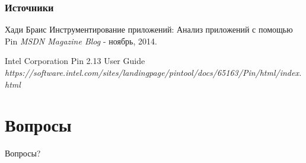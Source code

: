 \documentclass{beamer}
\begin{document}
\begin{frame}
\frametitle{Источники}
\footnotesize{
\begin{thebibliography}{99} %
 Хади Браис
\newblock Инструментирование приложений: Анализ приложений с помощью Pin
\newblock \emph{MSDN Magazine Blog} - ноябрь, 2014.
\end{thebibliography}

\begin{thebibliography}{98}
 Intel Corporation
\newblock Pin 2.13 User Guide
\newblock \emph{https://software.intel.com/sites/landingpage/pintool/docs/65163/Pin/html/index.html}
\end{thebibliography}
}
\end{frame}

\section{Вопросы}

\begin{frame}
\Huge{\centerline{Вопросы?}}
\end{frame}

\end{document}
